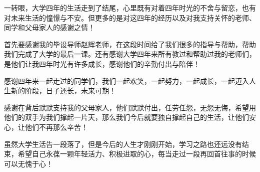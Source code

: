 \begin{thanksfor}
一转眼，大学四年的生活走到了结尾，心里既有对着四年时光的不舍与留恋，也有对未来生活的憧憬与不安。但更多的是对这四年的经历以及对我支持关怀的老师、同学和父母家人的感谢之情！

首先要感谢我的毕设导师赵辉老师，在这段时间给了我们很多的指导与帮助，帮助我们完成了大学的最后一课。还有感谢大学四年来所有教过和帮助过我的老师们，是他们让我四年时光有许多成长，感谢他们的辛勤付出与陪伴！

感谢四年来一起走过的同学们，我们一起欢笑，一起努力，一起成长，一起迈入人生新的阶段，日子还长，未来可期！

感谢在背后默默支持我的父母家人，他们默默付出，任劳任怨，无怨无悔，希望用他们的双手为我们撑起一片天，那么我们今后就要独自撑起自己的生活，让他们安心，让他们不再那么辛苦！

虽然大学生活告一段落了，但是今后的人生才刚刚开始，学习之路也还远没有结束，希望自己永葆一颗年轻活力、积极进取的心，每当走过一段再回首往事的时候可以无愧于心！
\end{thanksfor}